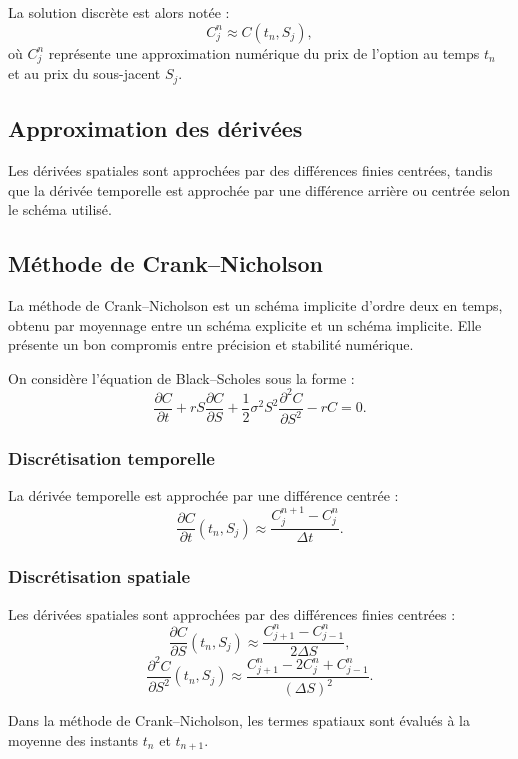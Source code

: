 \documentclass[12pt,a4paper]{article}
\begin{document}
La solution discrète est alors notée :
\[
C_j^n \approx C(t_n,S_j),
\]
où $C_j^n$ représente une approximation numérique du prix de l’option au temps
$t_n$ et au prix du sous-jacent $S_j$.


\subsection{Approximation des dérivées}

Les dérivées spatiales sont approchées par des différences finies centrées, tandis
que la dérivée temporelle est approchée par une différence arrière ou centrée selon
le schéma utilisé.

\subsection{Méthode de Crank--Nicholson}

La méthode de Crank--Nicholson est un schéma implicite d’ordre deux en temps,
obtenu par moyennage entre un schéma explicite et un schéma implicite. Elle
présente un bon compromis entre précision et stabilité numérique.

On considère l’équation de Black--Scholes sous la forme :
\begin{equation}
\frac{\partial C}{\partial t}
+ rS \frac{\partial C}{\partial S}
+ \frac{1}{2}\sigma^2 S^2 \frac{\partial^2 C}{\partial S^2}
- rC = 0.
\end{equation}

\subsubsection*{Discrétisation temporelle}

La dérivée temporelle est approchée par une différence centrée :
\[
\frac{\partial C}{\partial t}(t_n,S_j)
\approx
\frac{C_j^{n+1} - C_j^{n}}{\Delta t}.
\]

\subsubsection*{Discrétisation spatiale}

Les dérivées spatiales sont approchées par des différences finies centrées :
\[
\frac{\partial C}{\partial S}(t_n,S_j)
\approx
\frac{C_{j+1}^n - C_{j-1}^n}{2\Delta S},
\]
\[
\frac{\partial^2 C}{\partial S^2}(t_n,S_j)
\approx
\frac{C_{j+1}^n - 2C_j^n + C_{j-1}^n}{(\Delta S)^2}.
\]

Dans la méthode de Crank--Nicholson, les termes spatiaux sont évalués à la moyenne
des instants $t_n$ et $t_{n+1}$.
\end{document}
